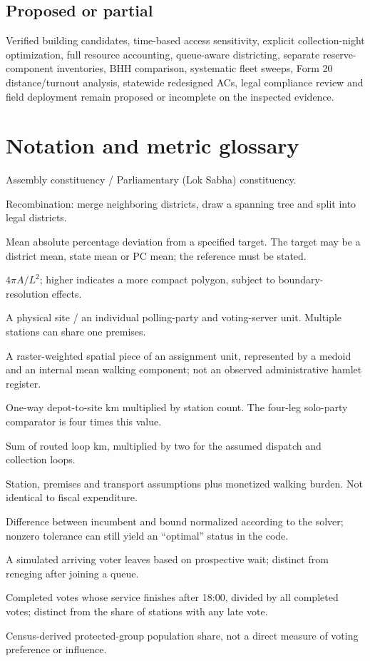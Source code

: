 \documentclass[11pt,a4paper,oneside]{report}
\begin{document}
\section{Proposed or partial}
\enlargethispage{3\baselineskip}
Verified building candidates, time-based access sensitivity, explicit collection-night optimization, full resource accounting, queue-aware districting, separate reserve-component inventories, BHH comparison, systematic fleet sweeps, Form 20 distance/turnout analysis, statewide redesigned ACs, legal compliance review and field deployment remain proposed or incomplete on the inspected evidence.

\chapter{Notation and metric glossary}
\begin{description}[style=nextline]
\item[AC / PC] Assembly constituency / Parliamentary (Lok Sabha) constituency.
\item[ReCom] Recombination: merge neighboring districts, draw a spanning tree and split into legal districts.
\item[MAD] Mean absolute percentage deviation from a specified target. The target may be a district mean, state mean or PC mean; the reference must be stated.
\item[Polsby--Popper] $4\pi A/L^2$; higher indicates a more compact polygon, subject to boundary-resolution effects.
\item[Premises / station] A physical site / an individual polling-party and voting-server unit. Multiple stations can share one premises.
\item[Hamlet / demand point] A raster-weighted spatial piece of an assignment unit, represented by a medoid and an internal mean walking component; not an observed administrative hamlet register.
\item[Star distance] One-way depot-to-site km multiplied by station count. The four-leg solo-party comparator is four times this value.
\item[Vehicle-km] Sum of routed loop km, multiplied by two for the assumed dispatch and collection loops.
\item[Generalized cost] Station, premises and transport assumptions plus monetized walking burden. Not identical to fiscal expenditure.
\item[Relative MIP gap] Difference between incumbent and bound normalized according to the solver; nonzero tolerance can still yield an ``optimal'' status in the code.
\item[Balking] A simulated arriving voter leaves based on prospective wait; distinct from reneging after joining a queue.
\item[After-close votes] Completed votes whose service finishes after 18:00, divided by all completed votes; distinct from the share of stations with any late vote.
\item[SC/ST share] Census-derived protected-group population share, not a direct measure of voting preference or influence.
\end{description}
\end{document}
